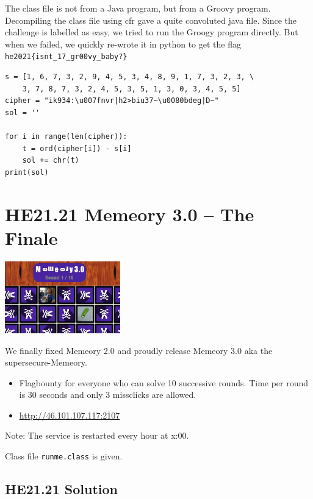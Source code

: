 \documentclass[english,a4paper,nols,noindent]{tufte-handout}
\begin{document}
\noindent The class file is not from a Java program, but from a Groovy
program.  Decompiling the class file using cfr gave a quite convoluted
java file.  Since the challenge is labelled as easy, we tried to run
the Groogy program directly.  But when we failed, we quickly re-wrote
it in python to get the flag \verb+he2021{isnt_17_gr00vy_baby?}+

\begin{verbatim}
s = [1, 6, 7, 3, 2, 9, 4, 5, 3, 4, 8, 9, 1, 7, 3, 2, 3, \
    3, 7, 8, 7, 3, 2, 4, 5, 3, 5, 1, 3, 0, 3, 4, 5, 5]
cipher = "ik934:\u007fnvr|h2>biu37~\u0080bdeg|D~"
sol = ''

for i in range(len(cipher)):
    t = ord(cipher[i]) - s[i]
    sol += chr(t)
print(sol)
\end{verbatim}

\hypertarget{he21.21}{%
  \section{HE21.21 Memeory 3.0 -- The Finale}
  \label{he21.21}}
\begin{marginfigure}
    \includegraphics[width=50mm]{images/challenge21.jpg}
\end{marginfigure}

\noindent We finally fixed Memeory 2.0 and proudly release Memeory 3.0 aka the supersecure-Memeory.

\begin{itemize}
\item Flagbounty for everyone who can solve 10 successive rounds. Time per round is 30 seconds and only 3 missclicks are allowed.
\item \url{http://46.101.107.117:2107}
\end{itemize}
Note: The service is restarted every hour at x:00.

\noindent Class file \verb+runme.class+ is given.

\hypertarget{he21.21-solution}{%
\subsection{HE21.21 Solution}\label{he21.21-solution}}
\end{document}
